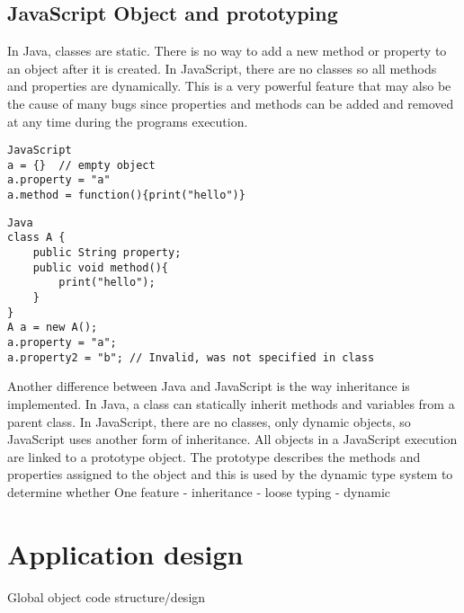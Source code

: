 \documentclass{report}
\begin{document}
	\subsection{JavaScript Object and prototyping}
	In Java, classes are static. There is no way to add a new method or property to an object after it is created. In JavaScript, there are no classes so all methods and properties are dynamically. This is a very powerful feature that may also be the cause of many bugs since properties and methods can be added and removed at any time during the programs execution.
\begin{verbatim}
JavaScript
a = {} 	// empty object
a.property = "a"
a.method = function(){print("hello")}
\end{verbatim}

\begin{verbatim}
Java
class A {
	public String property;
	public void method(){
		print("hello");
	}
}
A a = new A();
a.property = "a";
a.property2 = "b"; // Invalid, was not specified in class
\end{verbatim}
Another difference between Java and JavaScript is the way inheritance is implemented. In Java, a class can statically inherit methods and variables from a parent class. In JavaScript, there are no classes, only dynamic objects, so JavaScript uses another form of inheritance. All objects in a JavaScript execution are linked to a prototype object. The prototype describes the methods and properties assigned to the object and this is used by the dynamic type system to determine whether 
	One feature
	- inheritance
	- loose typing
	- dynamic
\section{Application design}
	Global object
	code structure/design
\end{document}

